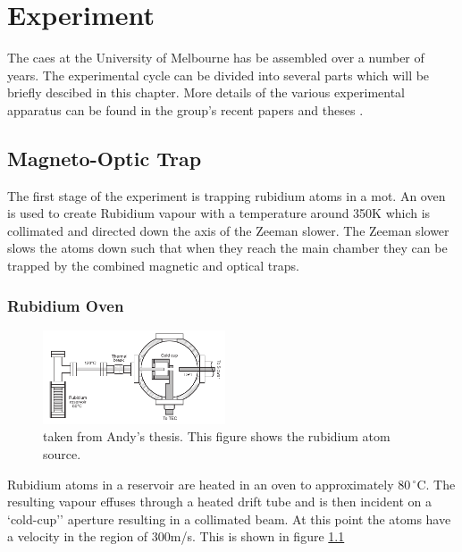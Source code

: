 \chapter{Experiment}

The \gls{caes} at the University of Melbourne has be assembled over a number of years. The experimental cycle can be divided into several parts which will be briefly descibed in this chapter. More details of the various experimental apparatus can be found in the group's recent papers \cite{bell_slow_2010, mcculloch_arbitrarily_2011, saliba_spatial_2012} and theses \cite{mcculloch_towards_2012, sheludko_shaped_2010, saliba_partially_2011}.


\section{Magneto-Optic Trap}

The first stage of the experiment is trapping rubidium atoms in a \gls{mot}. An oven is used to create Rubidium vapour with a temperature around 350K which is collimated and directed down the axis of the Zeeman slower. The Zeeman slower slows the atoms down such that when they reach the main chamber they can be trapped by the combined magnetic and optical traps.


\subsection{Rubidium Oven}

\begin{figure}
\vspace{-80pt}
\centering
\includegraphics[width=0.48\textwidth]{figs/oven.pdf}
\caption{{\color{red} taken from Andy's thesis.} This figure shows the rubidium atom source.}
\label{fig:oven}
\end{figure}

Rubidium atoms in a reservoir are heated in an oven to approximately $80\,^{\circ}\mathrm{C}$. The resulting vapour effuses through a heated drift tube and is then incident on a `cold-cup'' aperture resulting in a collimated beam. At this point the atoms have a velocity in the region of 300m/s. This is shown in figure \ref{fig:oven}


